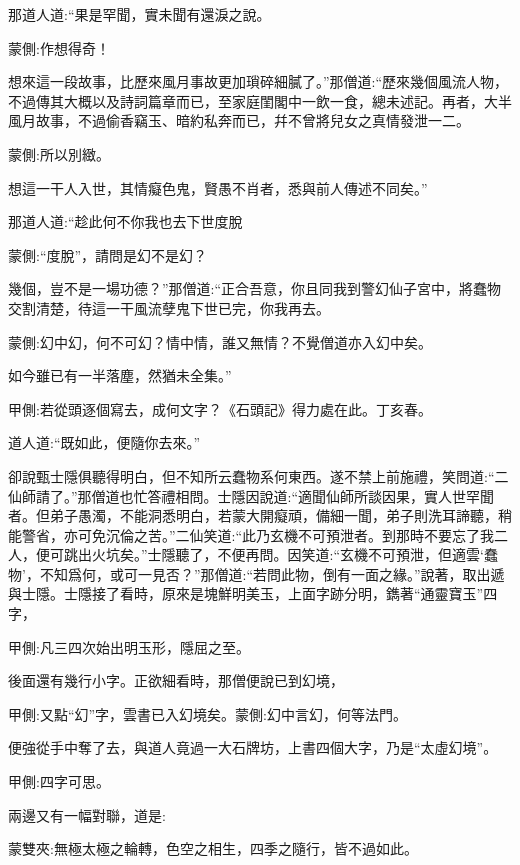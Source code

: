 \begin{parag}
    那道人道:“果是罕聞，實未聞有還淚之說。\begin{note}蒙側:作想得奇！\end{note}想來這一段故事，比歷來風月事故更加瑣碎細膩了。”那僧道:“歷來幾個風流人物，不過傳其大概以及詩詞篇章而已，至家庭閨閣中一飲一食，總未述記。再者，大半風月故事，不過偷香竊玉、暗約私奔而已，幷不曾將兒女之真情發泄一二。\begin{note}蒙側:所以別緻。\end{note}想這一干人入世，其情癡色鬼，賢愚不肖者，悉與前人傳述不同矣。”
\end{parag}


\begin{parag}
    那道人道:“趁此何不你我也去下世度脫\begin{note}蒙側:“度脫”，請問是幻不是幻？\end{note}幾個，豈不是一場功德？”那僧道:“正合吾意，你且同我到警幻仙子宮中，將蠢物交割清楚，待這一干風流孽鬼下世已完，你我再去。\begin{note}蒙側:幻中幻，何不可幻？情中情，誰又無情？不覺僧道亦入幻中矣。\end{note}如今雖已有一半落塵，然猶未全集。”\begin{note}甲側:若從頭逐個寫去，成何文字？《石頭記》得力處在此。丁亥春。\end{note}
\end{parag}


\begin{parag}
    道人道:“既如此，便隨你去來。”
\end{parag}


\begin{parag}
    卻說甄士隱俱聽得明白，但不知所云蠢物系何東西。遂不禁上前施禮，笑問道:“二仙師請了。”那僧道也忙答禮相問。士隱因說道:“適聞仙師所談因果，實人世罕聞者。但弟子愚濁，不能洞悉明白，若蒙大開癡頑，備細一聞，弟子則洗耳諦聽，稍能警省，亦可免沉倫之苦。”二仙笑道:“此乃玄機不可預泄者。到那時不要忘了我二人，便可跳出火坑矣。”士隱聽了，不便再問。因笑道:“玄機不可預泄，但適雲‘蠢物’，不知爲何，或可一見否？”那僧道:“若問此物，倒有一面之緣。”說著，取出遞與士隱。士隱接了看時，原來是塊鮮明美玉，上面字跡分明，鐫著“通靈寶玉”四字，\begin{note}甲側:凡三四次始出明玉形，隱屈之至。\end{note}後面還有幾行小字。正欲細看時，那僧便說已到幻境，\begin{note}甲側:又點“幻”字，雲書已入幻境矣。蒙側:幻中言幻，何等法門。\end{note}便強從手中奪了去，與道人竟過一大石牌坊，上書四個大字，乃是“太虛幻境”。\begin{note}甲側:四字可思。\end{note}兩邊又有一幅對聯，道是:\begin{note}蒙雙夾:無極太極之輪轉，色空之相生，四季之隨行，皆不過如此。\end{note}
\end{parag}


